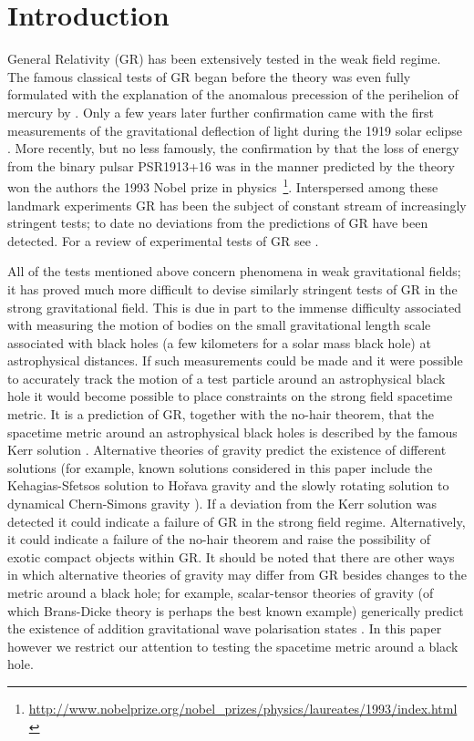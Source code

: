 \section{Introduction}
General Relativity (GR) has been extensively tested in the weak field regime. The famous classical tests of GR began before the theory was even fully formulated with the explanation of the anomalous precession of the perihelion of mercury by \cite{1915SPAW.......831E}. Only a few years later further confirmation came with the first measurements of the gravitational deflection of light during the 1919 solar eclipse \citep{1920RSPTA.220..291D}. More recently, but no less famously, the confirmation by \cite{1975ApJ...195L..51H} that the loss of energy from the binary pulsar PSR1913+16 was in the manner predicted by the theory won the authors the 1993 Nobel prize in physics~\footnote{\url{http://www.nobelprize.org/nobel_prizes/physics/laureates/1993/index.html}}. Interspersed among these landmark experiments GR has been the subject of constant stream of increasingly stringent tests; to date no deviations from the predictions of GR have been detected. For a review of experimental tests of GR see \cite{lrr-2006-3}. 

All of the tests mentioned above concern phenomena in weak gravitational fields; it has proved much more difficult to devise similarly stringent tests of GR in the strong gravitational field. This is due in part to the immense difficulty associated with measuring the motion of bodies on the small gravitational length scale associated with black holes (a few kilometers for a solar mass black hole) at astrophysical distances. If such measurements could be made and it were possible to accurately track the motion of a test particle around an astrophysical black hole it would become possible to place constraints on the strong field spacetime metric. It is a prediction of GR, together with the no-hair theorem, that the spacetime metric around an astrophysical black holes is described by the famous Kerr solution \citep{PhysRevLett.11.237}. Alternative theories of gravity predict the existence of different solutions (for example, known solutions considered in this paper include the Kehagias-Sfetsos solution \citep{2009PhLB..678..123K} to Ho\v{r}ava gravity \citep{2009PhRvL.102p1301H,2009PhRvD..79h4008H} and the slowly rotating solution \citep{2009PhRvD..79h4043Y} to dynamical Chern-Simons gravity \citep{2003PhRvD..68j4012J}). If a deviation from the Kerr solution was detected it could indicate a failure of GR in the strong field regime. Alternatively, it could indicate a failure of the no-hair theorem and raise the possibility of exotic compact objects within GR. It should be noted that there are other ways in which alternative theories of gravity may differ from GR besides changes to the metric around a black hole; for example, scalar-tensor theories of gravity (of which Brans-Dicke theory \citep{PhysRev.124.925} is perhaps the best known example) generically predict the existence of addition gravitational wave polarisation states \citep{lrr-2006-3}. In this paper however we restrict our attention to testing the spacetime metric around a black hole.

